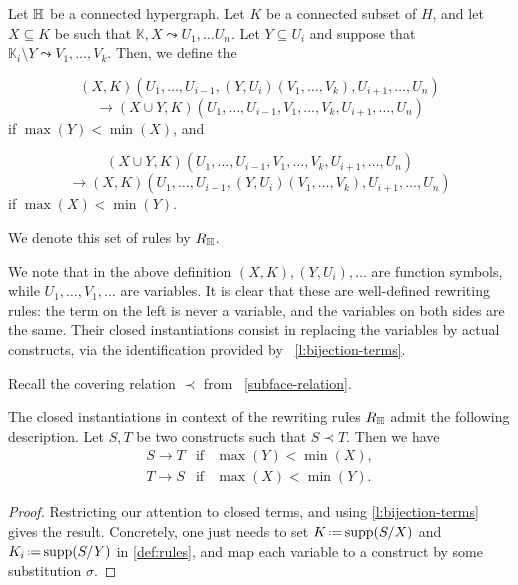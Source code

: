\begin{definition} \label{def:rules}
  Let ${\mathbb H}$ be a connected hypergraph. 
  Let $K$ be a connected subset of $H$, and let $X \subseteq K$ be such that $\mathbb{K},X \leadsto U_1,\ldots U_n$.
  Let $Y \subseteq U_i$ and suppose that $\mathbb{K}_i\setminus Y \leadsto V_1,\ldots, V_k$. 
  Then, we define the 
  \begin{samepage}
  $$(X,K)(U_1,\ldots, U_{i-1},(Y,U_i)(V_1,\ldots, V_k),U_{i+1},\ldots,U_n)$$
  $$ \longrightarrow (X\cup Y,K)(U_1,\ldots,U_{i-1},V_1,\ldots, V_k,U_{i+1},\ldots,U_n)$$
 if $\max(Y)<\min(X)$, and 
  \end{samepage}
  \begin{samepage}
  $$(X\cup Y,K)(U_1,\ldots,U_{i-1},V_1,\ldots, V_k,U_{i+1},\ldots,U_n)$$
  $$\longrightarrow (X,K)(U_1,\ldots, U_{i-1},(Y,U_i)(V_1,\ldots, V_k),U_{i+1},\ldots,U_n)$$
  if $\max(X)<\min(Y)$.
  \end{samepage}
  We denote this set of rules by $R_{\mathbb H}$.
\end{definition} 
We note that in the above definition $(X,K), (Y,U_i),\ldots$ are function symbols, while $U_1,\ldots,V_1,\ldots$ are variables.
It is clear that these are well-defined rewriting rules: the term on the left is never a variable, and the variables on both sides are the same.
Their closed instantiations consist in replacing the variables by actual constructs, via the identification provided by~ \cref{l:bijection-terms}.

Recall the covering relation $\prec$ from~ \cref{subface-relation}.
\begin{lemma} 
  The closed instantiations in context of the rewriting rules $R_{\mathbb H}$ admit the following description.
  Let $S,T$ be two constructs such that $S \prec T$.  
  Then we have
 $$\begin{array}{lll}
    S \to T &  \mathrm{if} & \max(Y)<\min(X), \\
    T \to S & \mathrm{if} & \max(X)<\min(Y).
  \end{array}$$
\end{lemma} 

\begin{proof}
  Restricting our attention to closed terms, and using \cref{l:bijection-terms} gives the result. 
  Concretely, one just needs to set $K\eqdef \supp(\occ{S}{X})$ and $K_i\eqdef \supp(\occ{S}{Y})$ in \cref{def:rules}, and map each variable to a construct by some substitution $\sigma$.
\end{proof}

